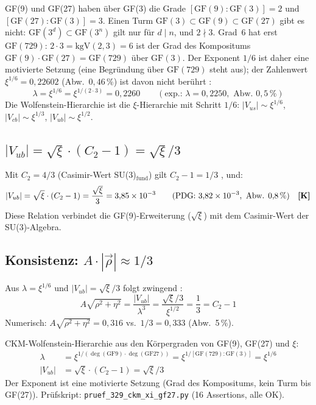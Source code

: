 GF(9) und GF(27) haben über GF(3) die Grade $[\mathrm{GF}(9):\mathrm{GF}(3)] = 2$
und $[\mathrm{GF}(27):\mathrm{GF}(3)] = 3$. Einen Turm
$\mathrm{GF}(3) \subset \mathrm{GF}(9) \subset \mathrm{GF}(27)$ gibt es nicht:
$\mathrm{GF}(3^d)\subset\mathrm{GF}(3^n)$ gilt nur für $d \mid n$, und $2 \nmid 3$.
Grad~6 hat erst $\mathrm{GF}(729)$: $2\cdot 3 = \mathrm{kgV}(2,3) = 6$ ist der Grad
des Kompositums $\mathrm{GF}(9)\cdot\mathrm{GF}(27) = \mathrm{GF}(729)$ über $\mathrm{GF}(3)$.
Der Exponent $1/6$ ist daher eine motivierte Setzung (eine Begründung über
$\mathrm{GF}(729)$ steht aus); der Zahlenwert $\xi^{1/6} = 0{,}22602$
(Abw.\ $0{,}46\,\%$) ist davon nicht berührt \KM:
\begin{equation}
  \lambda = \xi^{1/6} = \xi^{1/(2\cdot 3)} = 0{,}2260
  \qquad (\text{exp.: } \lambda = 0{,}2250, \text{ Abw. } 0{,}5\,\%)
\end{equation}
Die Wolfenstein-Hierarchie ist die $\xi$-Hierarchie mit Schritt $1/6$:
$|V_{us}|\sim\xi^{1/6}$, $|V_{cb}|\sim\xi^{1/3}$, $|V_{ub}|\sim\xi^{1/2}$.

\subsection{$|V_{ub}| = \sqrt{\xi}\cdot(C_2-1) = \sqrt{\xi}/3$}

Mit $C_2 = 4/3$ (Casimir-Wert SU(3)$_\text{fund}$) gilt $C_2-1 = 1/3$ \BM, und:
\begin{equation}
  |V_{ub}| = \sqrt{\xi}\cdot(C_2-1) = \frac{\sqrt{\xi}}{3}
  = 3{,}85\times10^{-3}
  \qquad (\text{PDG: } 3{,}82\times10^{-3}, \text{ Abw. } 0{,}8\,\%) \quad \textbf{[K]}
\end{equation}
Diese Relation verbindet die GF(9)-Erweiterung ($\sqrt{\xi}$) mit dem
Casimir-Wert der SU(3)-Algebra.

\subsection{Konsistenz: $A\cdot|\vec{\rho}| \approx 1/3$}

Aus $\lambda=\xi^{1/6}$ und $|V_{ub}|=\sqrt{\xi}/3$ folgt zwingend \KM:
\begin{equation}
  A\sqrt{\rho^2+\eta^2} = \frac{|V_{ub}|}{\lambda^3} = \frac{\sqrt{\xi}/3}{\xi^{1/2}}
  = \frac{1}{3} = C_2-1
\end{equation}
Numerisch: $A\sqrt{\rho^2+\eta^2} = 0{,}316$ vs.\ $1/3 = 0{,}333$ (Abw.\ 5\,\%).

\begin{keyresult}[Status~\KM]
CKM-Wolfenstein-Hierarchie aus den Körpergraden von GF(9), GF(27) und $\xi$:
\begin{align*}
  \lambda &= \xi^{1/(\deg(\mathrm{GF}9)\cdot\deg(\mathrm{GF}27))}
  = \xi^{1/[\mathrm{GF}(729):\mathrm{GF}(3)]} = \xi^{1/6}\\
  |V_{ub}| &= \sqrt{\xi}\cdot(C_2-1) = \sqrt{\xi}/3
\end{align*}
Der Exponent ist eine motivierte Setzung (Grad des Kompositums, kein Turm bis GF(27)).
Prüfskript: \texttt{pruef\_329\_ckm\_xi\_gf27.py} (16 Assertions, alle OK).
\end{keyresult}

